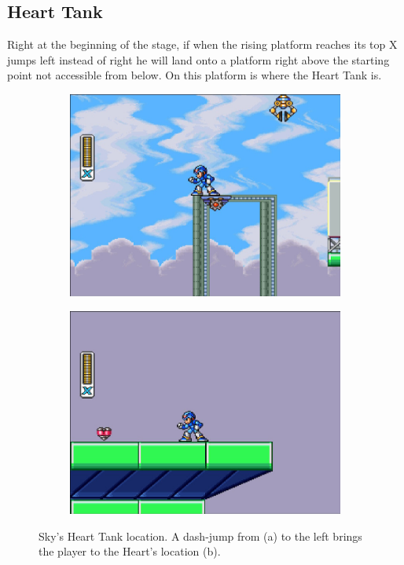 \subsection{Heart Tank}
Right at the beginning of the stage, if when the rising platform reaches its top X jumps left instead of right he will land onto a platform right above the starting point not accessible from below. On this platform is where the Heart Tank is.
\begin{figure}[htp]
	\centering
	\begin{subfigure}{0.4\linewidth}
		\centering
		\includegraphics[width=\linewidth]{figures/X1/Storm_eagle/Storm_heart_1.jpg}
		\caption{}
	\end{subfigure}
	\begin{subfigure}{0.4\linewidth}
		\centering
		\includegraphics[width=\linewidth]{figures/X1/Storm_eagle/Storm_heart_2.jpg}
		\caption{}
	\end{subfigure}
	\caption{Sky's Heart Tank location. A dash-jump from (a) to the left brings the player to the Heart's location (b).}
\end{figure}

